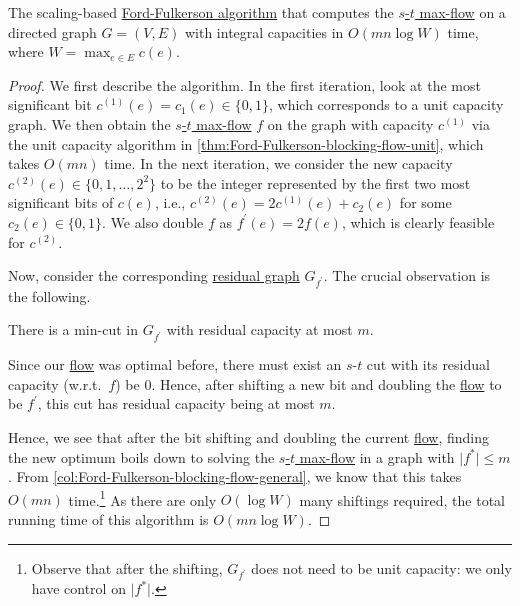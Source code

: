 \begin{theorem}\label{thm:Ford-Fulkerson-scaling}
	The scaling-based \hyperref[algo:Ford-Fulkerson]{Ford-Fulkerson algorithm} that computes the \hyperref[prb:s-t-max-flow]{\(s\)-\(t\) max-flow} on a directed graph \(G = (V, E)\) with integral capacities in \(O(mn \log W)\) time, where \(W = \max _{e \in E} c(e)\).
\end{theorem}
\begin{proof}
	We first describe the algorithm. In the first iteration, look at the most significant bit \(c^{(1)}(e) = c_1(e) \in \{ 0, 1 \} \), which corresponds to a unit capacity graph. We then obtain the \hyperref[prb:s-t-max-flow]{\(s\)-\(t\) max-flow} \(f\) on the graph with capacity \(c^{(1)}\) via the unit capacity algorithm in \autoref{thm:Ford-Fulkerson-blocking-flow-unit}, which takes \(O(mn)\) time. In the next iteration, we consider the new capacity \(c^{(2)}(e) \in \{ 0, 1, \dots , 2^2 \} \) to be the integer represented by the first two most significant bits of \(c(e)\), i.e., \(c^{(2)} (e) = 2 c^{(1)}(e) + c_2(e)\) for some \(c_2(e) \in \{ 0, 1 \} \). We also double \(f\) as \(f^{\prime} (e) = 2 f(e)\), which is clearly feasible for \(c^{(2)}\).

	Now, consider the corresponding \hyperref[def:residual-graph]{residual graph} \(G_{f^{\prime} }\). The crucial observation is the following.

	\begin{claim}
		There is a min-cut in \(G_{f^{\prime} }\) with residual capacity at most \(m\).
	\end{claim}
	\begin{explanation}
		Since our \hyperref[def:flow]{flow} was optimal before, there must exist an \(s\)-\(t\) cut with its residual capacity (w.r.t.\ \(f\)) be \(0\). Hence, after shifting a new bit and doubling the \hyperref[def:flow]{flow} to be \(f^{\prime} \), this cut has residual capacity being at most \(m\).
	\end{explanation}

	Hence, we see that after the bit shifting and doubling the current \hyperref[def:flow]{flow}, finding the new optimum boils down to solving the \hyperref[prb:s-t-max-flow]{\(s\)-\(t\) max-flow} in a graph with \(\lvert f^{\ast} \rvert \leq m\). From \autoref{col:Ford-Fulkerson-blocking-flow-general}, we know that this takes \(O(mn)\) time.\footnote{Observe that after the shifting, \(G_{f^{\prime} }\) does not need to be unit capacity: we only have control on \(\lvert f^{\ast} \rvert \).} As there are only \(O(\log W)\) many shiftings required, the total running time of this algorithm is \(O(mn \log W)\).
\end{proof}

